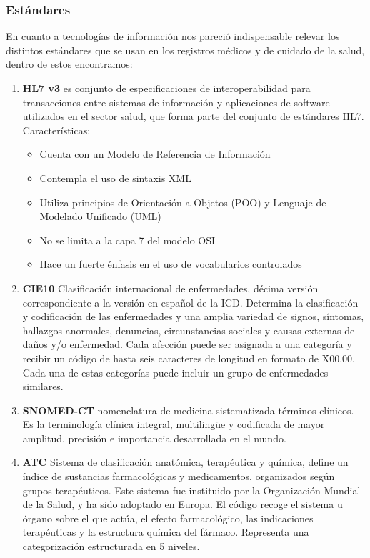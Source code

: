 {\correccionTexto
\subsubsection{Estándares}
En cuanto a tecnologías de información nos pareció indispensable relevar los distintos estándares que se usan en los registros médicos y de cuidado de la salud, dentro de estos encontramos:

\begin{enumerate}
	\item\textbf{HL7 v3} es conjunto de especificaciones de interoperabilidad para transacciones entre sistemas de información y aplicaciones de software utilizados en el sector salud, que forma parte del conjunto de estándares HL7. Características:
    	\begin{itemize}
			\item Cuenta con un Modelo de Referencia de Información
            \item Contempla el uso de sintaxis XML
            \item Utiliza principios de Orientación a Objetos (POO) y Lenguaje de Modelado Unificado (UML)
            \item No se limita a la capa 7 del modelo OSI
            \item Hace un fuerte énfasis en el uso de vocabularios controlados
		\end{itemize}
    
    \item\textbf{CIE10}  Clasificación internacional de enfermedades, décima versión correspondiente a la versión en español de la ICD. Determina la clasificación y codificación de las enfermedades y una amplia variedad de signos, síntomas, hallazgos anormales, denuncias, circunstancias sociales y causas externas de daños y/o enfermedad. Cada afección puede ser asignada a una categoría y recibir un código de hasta seis caracteres de longitud en formato de X00.00. Cada una de estas categorías puede incluir un grupo de enfermedades similares.
    
    \item\textbf{SNOMED-CT} nomenclatura de medicina sistematizada \- términos clínicos. Es la terminología clínica integral, multiling\"{u}e y codificada de mayor amplitud, precisión e importancia desarrollada en el mundo.
    
    \item\textbf{ATC} Sistema de clasificación anatómica, terapéutica y química, define un índice de sustancias farmacológicas y medicamentos, organizados según grupos terapéuticos. Este sistema fue instituido por la Organización Mundial de la Salud, y ha sido adoptado en Europa. El código recoge el sistema u órgano sobre el que actúa, el efecto farmacológico, las indicaciones terapéuticas y la estructura química del fármaco. Representa una categorización estructurada en 5 niveles.
    

\end{enumerate}}
